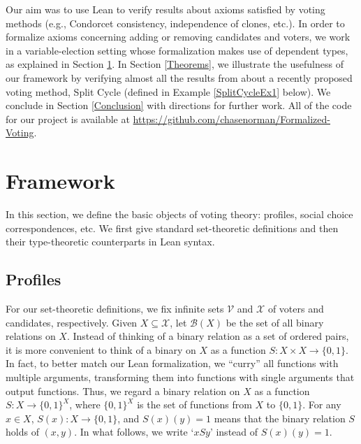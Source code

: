\documentclass[runningheads]{llncs}
\begin{document}
Our aim was to use Lean to verify results about axioms satisfied by voting methods (e.g., Condorcet consistency, independence of clones, etc.). In order to formalize axioms concerning adding or removing candidates and voters, we work in a variable-election setting whose formalization makes use of dependent types, as explained in Section \ref{Framework}.  In Section \ref{Theorems}, we illustrate the usefulness  of our  framework by verifying almost all the results from \cite{HP2020} about a recently proposed voting method, Split Cycle (defined in Example \ref{SplitCycleEx1} below). We conclude in Section \ref{Conclusion} with directions for further work. All of the code for our project is available at \url{https://github.com/chasenorman/Formalized-Voting}.



 
\section{Framework}\label{Framework}

In this section, we define the basic objects of voting theory: profiles, social choice correspondences, etc. We first give standard set-theoretic definitions and then their type-theoretic counterparts in Lean syntax.

\subsection{Profiles}

For our set-theoretic definitions, we fix infinite sets $\mathcal{V}$ and $\mathcal{X}$ of voters and candidates, respectively. Given $X\subseteq\mathcal{X}$, let $\mathcal{B}(X)$ be the set of all binary relations on $X$. Instead of thinking of a binary relation as a set of ordered pairs, it is more convenient to think of a binary on $X$ as a function $S: X\times X \to \{0,1\}$. In fact, to better match our Lean formalization, we ``curry'' all functions with multiple arguments, transforming them into functions with single arguments that output functions. Thus, we regard a binary relation on $X$ as a function  $S:X\to \{0,1\}^X$, where $\{0,1\}^X$ is the set of functions from $X$ to $\{0,1\}$. For any $x\in X$, $S(x): X\to \{0,1\}$, and $S(x)(y)=1$ means that the binary relation $S$ holds of $(x,y)$. In what follows, we write `$xSy$' instead of $S(x)(y)=1$.

\end{document}
